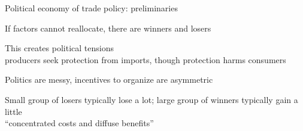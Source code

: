 \documentclass[notes,11pt, aspectratio=169, xcolor=table]{beamer}
\newenvironment{wideitemize}{\itemize\addtolength{\itemsep}{10pt}}{\enditemize}
\begin{document}
\begin{frame}{Political economy of trade policy: preliminaries}
    \begin{wideitemize}
        \item If factors cannot reallocate, there are winners and losers
        \item This creates political tensions\\
        \qquad producers seek protection from imports, though protection harms consumers  
        \item Politics are messy, incentives to organize are asymmetric
        \item Small group of losers typically lose a lot; large group of winners typically gain a little \\
        \qquad ``concentrated costs and diffuse benefits''
        
    \end{wideitemize}
\end{frame}
\end{document}
